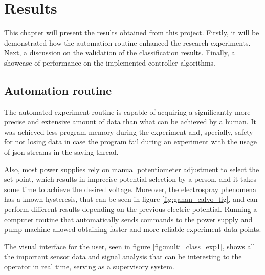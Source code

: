 \chapter{Results}
\label{chap:Results}

This chapter will present the results obtained from this project. 
Firstly, it will be demonstrated how the automation routine enhanced the research experiments. 
Next, a discussion on the validation of the classification results. 
Finally, a showcase of performance on the implemented controller algorithms.

\section{Automation routine}
\label{sec:automation_routine}

The automated experiment routine is capable of acquiring a significantly more precise and extensive amount of data than what can be achieved by a human. 
It was achieved less program memory during the experiment and, specially, safety for not losing data in case the program fail during an experiment with the usage of json streams in the saving thread.

Also, most power supplies rely on manual potentiometer adjustment to select the set point, which results in imprecise potential selection by a person, and it takes some time to achieve the desired voltage.
Moreover, the electrospray phenomena has a known hysteresis, that can be seen in figure \ref{fig:ganan_calvo_fig}, and can perform different results depending on the previous electric potential.
Running a computer routine that automatically sends commands to the power supply and pump machine allowed obtaining faster and more reliable experiment data points.

The visual interface for the user, seen in figure \ref{fig:multi_class_exp1}, shows all the important sensor data and signal analysis that can be interesting to the operator in real time, serving as a supervisory system.

